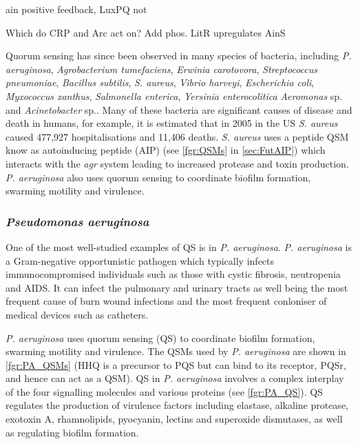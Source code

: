 ain positive feedback, LuxPQ not\cite{Lupp2004}

Which do CRP and Arc act on?
Add phos.
LitR upregulates AinS\cite{Lupp2004}





Quorum sensing has since been observed in many species of bacteria, including \textit{P. aeruginosa}, \textit{Agrobacterium tumefaciens}, \textit{Erwinia carotovora}, \textit{Streptococcus pneumoniae}, \textit{Bacillus subtilis}, \textit{S. aureus}, \textit{Vibrio harveyi}, \textit{Escherichia coli}, \textit{Myxococcus xanthus}, \textit{Salmonella enterica}, \textit{Yersinia enterocolitica}  \textit{Aeromonas} sp. and \textit{Acinetobacter} sp.\cite{Miller2001,Fuqua1994,Waters2005,Atkinson2006,Chan2011,Sauer2002,Michael2001,Ahmer2004,Nealson1970}. 
Many of these bacteria are significant causes of disease and death in humans, for example, it is estimated that in 2005 in the US \textit{S. aureus} caused 477,927 hospitalisations and 11,406 deaths\cite{Klein2007}. \textit{S. aureus} uses a peptide QSM know as autoinducing peptide (AIP) (see \ref{fgr:QSMs} in \ref{sec:FutAIP}) which interacts with the \textit{agr} system leading to increased protease and toxin production\cite{Antunes2010}. \textit{P. aeruginosa} also uses quorum sensing to coordinate biofilm formation, swarming motility and virulence.






\subsubsection{\textit{Pseudomonas aeruginosa}\label{sec:PAQSMs}}

One of the most well-studied examples of QS is in \textit{P. aeruginosa}.
\textit{P. aeruginosa} is a Gram-negative opportunistic pathogen which typically infects immunocompromised individuals such as those with cystic fibrosis, neutropenia and AIDS. It can infect the pulmonary and urinary tracts as well being the most frequent cause of burn wound infections and the most frequent conloniser of medical devices such as catheters\cite{Bodey1983}.

\textit{P. aeruginosa} uses quorum sensing (QS) to coordinate biofilm formation, swarming motility and virulence. The QSMs used by \textit{P. aeruginosa} are shown in \ref{fgr:PA_QSMs} (HHQ  is a precursor to PQS  but can bind to its receptor, PQSr, and hence can act as a QSM\cite{Xiao2006}). QS in \textit{P. aeruginosa} involves a complex interplay of the four signalling molecules and various proteins (see \ref{fgr:PA_QS})\cite{Dubern2008}. QS regulates the production of virulence factors including elastase, alkaline protease, exotoxin A, rhamnolipids, pyocyanin, lectins and superoxide dismutases, as well as regulating biofilm formation.

